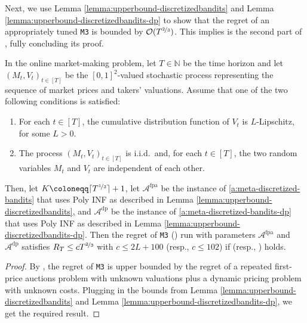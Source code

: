 \documentclass[final,12pt]{colt2025}
\newcommand{\cA}{\mathcal{A}}
\newcommand{\cO}{\mathcal{O}}
\newcommand{\N}{\mathbb{N}}
\newcommand{\vin}{\texttt{M3}}
\newcommand{\nP}{M}
\newcommand{\nZ}{V}
\begin{document}
Next, we use Lemma \ref{lemma:upperbound-discretizedbandits} and Lemma \ref{lemma:upperbound-discretizedbandits-dp} to show that the regret of an appropriately tuned \vin{} is bounded by $\cO(T^{\nicefrac{2}{3}})$.
This implies is the second part of , fully concluding its proof.

\begin{lemma}\label{t:upper-T23-VIN}
    In the online market-making problem,
    let $T \in \N$ be the time horizon and let $(\nP_t,\nZ_t)_{t \in [T]}$ be the $[0,1]^2$-valued stochastic process representing the sequence of market prices and takers' valuations.
    Assume that one of the two following conditions is satisfied:
    \begin{enumerate}
        \item \label{t:assOnePrimeAppe}
        For each $t \in [T]$, the cumulative distribution function of $\nZ_t$ is $L$-Lipschitz, for some $L>0$. 
        \item \label{t:assTwoPrimeAppe}
        The process $( \nP_t , \nZ_t )_{t \in [T]}$ is i.i.d.\ and, for each $t \in [T]$, the two random variables $\nP_t$ and $\nZ_t$ are independent of each other.
    \end{enumerate}
    Then, let $K \coloneqq \lceil T^{\nicefrac{1}{3}} \rceil + 1$, let $\cA^{\mathrm{fpa}}$ be the instance of \cref{a:meta-discretized-bandits} that uses Poly INF as described in Lemma \ref{lemma:upperbound-discretizedbandits}, and $\cA^{\mathrm{dp}}$ be the instance of \cref{a:meta-discretized-bandits-dp} that uses Poly INF as described in Lemma \ref{lemma:upperbound-discretizedbandits-dp}. Then the regret of \vin{} () run with parameters $\cA^{\mathrm{fpa}}$ and $\cA^{\mathrm{dp}}$ satisfies
    $
        R_T
    \le
        c T^{\nicefrac{2}{3}}
    $
    with $c \le 2L+100$ (resp., $c \le 102$) if  (resp., ) holds.
\end{lemma}
\begin{proof}
    By , the regret of \vin{} is upper bounded by the regret of a repeated first-price auctions problem with unknown valuations plus a dynamic pricing problem with unknown costs. Plugging in the bounds from Lemma \ref{lemma:upperbound-discretizedbandits} and Lemma \ref{lemma:upperbound-discretizedbandits-dp}, we get the required result.
\end{proof}
\end{document}
